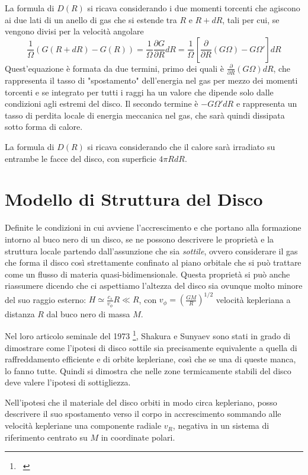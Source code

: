 \documentclass[a4paperbi]{article}
\begin{document}
	La formula di $D(R)$ si ricava considerando i due momenti torcenti che agiscono ai due lati di un anello di gas che si estende tra $R$ e $R+dR$, tali per cui, se vengono divisi per la velocità angolare
	\begin{equation}
		\frac{1}{\Omega}(G(R+dR)-G(R))=\frac{1}{\Omega}\frac{\partial G}{\partial R}dR=\frac{1}{\Omega}\left[\frac{\partial}{\partial R}(G\Omega)-G\Omega'\right]dR
	\end{equation}
	Quest'equazione è formata da due termini, primo dei quali è $\frac{\partial}{\partial R}(G\Omega)dR$, che rappresenta il tasso di "spostamento" dell'energia nel gas per mezzo dei momenti torcenti e se integrato per tutti i raggi ha un valore che dipende solo dalle condizioni agli estremi del disco. Il secondo termine è $-G\Omega'dR$ e rappresenta un tasso di perdita locale di energia meccanica nel gas, che sarà quindi dissipata sotto forma di calore.
	
	La formula di $D(R)$ si ricava considerando che il calore sarà irradiato su entrambe le facce del disco, con superficie $4\pi RdR$.

\newpage
\section{Modello di Struttura del Disco} 	
	Definite le condizioni in cui avviene l'accrescimento e che portano alla formazione intorno al buco nero di un disco, se ne possono descrivere le proprietà e la struttura locale partendo dall'assunzione che sia \textit{sottile}, ovvero considerare il gas che forma il disco così strettamente confinato al piano orbitale che si può trattare come un flusso di materia quasi-bidimensionale. Questa proprietà si può anche riassumere dicendo che ci aspettiamo l'altezza del disco sia ovunque molto minore del suo raggio esterno: $H\simeq\frac{c_s}{v_\phi}R\ll R$, con $v_\phi=\left(\frac{GM}{R}\right)^{1/2}$ velocità kepleriana a distanza $R$ dal buco nero di massa $M$.
	
	Nel loro articolo seminale del 1973 \footnote{~\cite{ShakuraSunyaev1973}}, Shakura e Sunyaev sono stati in grado di dimostrare come l'ipotesi di disco sottile sia precisamente equivalente a quella di raffreddamento efficiente e di orbite kepleriane, così che se una di queste manca, lo fanno tutte. Quindi si dimostra che nelle zone termicamente stabili del disco deve valere l'ipotesi di sottigliezza.
	
	Nell'ipotesi che il materiale del disco orbiti in modo circa kepleriano, posso descrivere il suo spostamento verso il corpo in accrescimento sommando alle velocità kepleriane una componente radiale $v_R$, negativa in un sistema di riferimento centrato su $M$ in coordinate polari.
	
\end{document}
